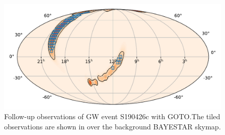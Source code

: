 \begin{colsection}
\begin{colsection}
\begin{figure}[p]
    \begin{center}
        \includegraphics[width=0.9\linewidth]{images/190426_goto.pdf}
    \end{center}
    \caption[Follow-up observations of S190426c with GOTO]{
        Follow-up observations of GW event S190426c with GOTO.\@ The tiled observations are shown in  over the background BAYESTAR skymap.
        }\label{fig:190426_goto}
\end{figure}

\clearpage

\end{colsection}


\end{colsection}


\newpage
